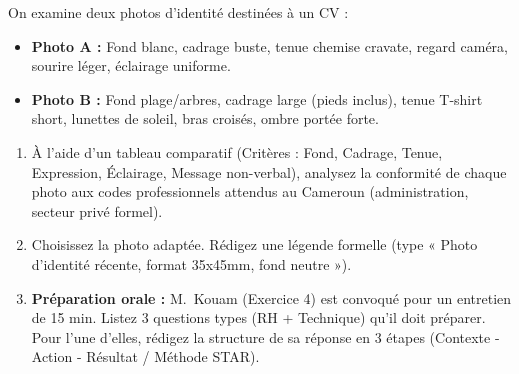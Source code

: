 \documentclass[11pt]{article}
\begin{document}
\begin{exercice}
On examine deux photos d'identité destinées à un CV : 
\begin{itemize}
    \item \textbf{Photo A :} Fond blanc, cadrage buste, tenue chemise cravate, regard caméra, sourire léger, éclairage uniforme.
    \item \textbf{Photo B :} Fond plage/arbres, cadrage large (pieds inclus), tenue T-shirt short, lunettes de soleil, bras croisés, ombre portée forte.
\end{itemize}
\begin{enumerate}
    \item À l'aide d'un tableau comparatif (Critères : Fond, Cadrage, Tenue, Expression, Éclairage, Message non-verbal), analysez la conformité de chaque photo aux codes professionnels attendus au Cameroun (administration, secteur privé formel).
    \item Choisissez la photo adaptée. Rédigez une légende formelle (type « Photo d'identité récente, format 35x45mm, fond neutre »).
    \item \textbf{Préparation orale :} M.~Kouam (Exercice 4) est convoqué pour un entretien de 15 min. Listez 3 questions types (RH + Technique) qu'il doit préparer. Pour l'une d'elles, rédigez la structure de sa réponse en 3 étapes (Contexte - Action - Résultat / Méthode STAR).
\end{enumerate}
\end{exercice}
\end{document}
